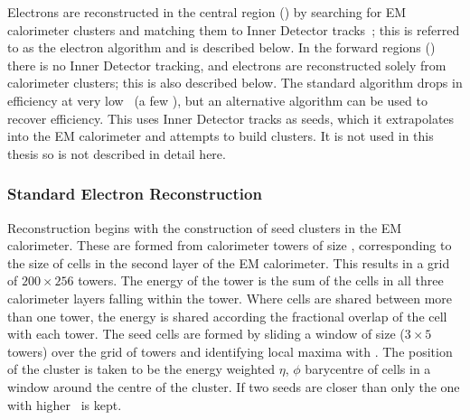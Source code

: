 Electrons are reconstructed in the central region () by searching
for EM calorimeter clusters and matching them to Inner Detector
tracks~\cite{ATL-PHYS-PUB-2011-006,Aad:2011mk}; this is
referred to as the  electron algorithm and is described below.
In the forward regions () there is no Inner Detector
tracking, and electrons are reconstructed solely from calorimeter clusters; this
is also described below. The standard algorithm drops in efficiency at very
low \pt\
(a few \gev), but an alternative  algorithm can be used to recover
efficiency. This uses Inner Detector tracks as seeds, which it extrapolates into
the EM calorimeter and attempts to build clusters. It is not used in
this thesis so is not described in detail here.

\subsubsection{Standard Electron Reconstruction}

Reconstruction begins
with the construction of seed clusters in the EM calorimeter. These are formed from
calorimeter towers of size \deltaetadeltaphi{0.025}{0.025}, corresponding to the
size of cells in the second layer of the EM calorimeter. This
results in a grid of $200 \times 256$ towers. The energy
of the tower is the sum of the cells in all three calorimeter layers
falling within the tower. Where cells are shared between more than one tower, the
energy is shared according the fractional overlap of the cell with each
tower. The seed cells are formed by sliding a
window of size  ($3 \times 5$ towers) over the
grid of towers and identifying local maxima with \etgt{2.5}. The position
of the cluster is taken to be the energy weighted $\eta$, $\phi$ barycentre of
cells in a window around the centre of the cluster. If two seeds are closer than
\deltaetadeltaphi{0.050}{0.050} only the one with higher \et\ is kept.

